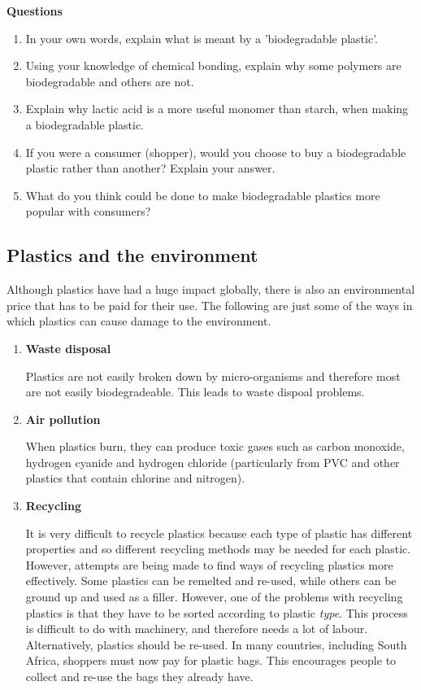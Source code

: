 {\textbf{Questions}

\begin{enumerate}
\item{In your own words, explain what is meant by a 'biodegradable plastic'.}
\item{Using your knowledge of chemical bonding, explain why some polymers are biodegradable and others are not.}
\item{Explain why lactic acid is a more useful monomer than starch, when making a biodegradable plastic.}
\item{If you were a consumer (shopper), would you choose to buy a biodegradable plastic rather than another? Explain your answer.}
\item{What do you think could be done to make biodegradable plastics more popular with consumers?}
\end{enumerate}
}

\subsection{Plastics and the environment}

Although plastics have had a huge impact globally, there is also an environmental price that has to be paid for their use. The following are just some of the ways in which plastics can cause damage to the environment.

\begin{enumerate}
\item{\textbf{Waste disposal}

Plastics are not easily broken down by micro-organisms and therefore most are not easily biodegradeable. This leads to waste dispoal problems.
}
\item{\textbf{Air pollution}

When plastics burn, they can produce toxic gases such as carbon monoxide, hydrogen cyanide and hydrogen chloride (particularly from PVC and other plastics that contain chlorine and nitrogen).
}

\item{\textbf{Recycling}

It is very difficult to recycle plastics because each type of plastic has different properties and so different recycling methods may be needed for each plastic. However, attempts are being made to find ways of recycling plastics more effectively. Some plastics can be remelted and re-used, while others can be ground up and used as a filler. However, one of the problems with recycling plastics is that they have to be sorted according to plastic \textit{type}. This process is difficult to do with machinery, and therefore needs a lot of labour. Alternatively, plastics should be re-used. In many countries, including South Africa, shoppers must now pay for plastic bags. This encourages people to collect and re-use the bags they already have.
}
\end{enumerate}


